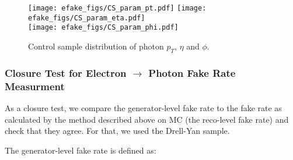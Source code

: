 
\begin{figure}[h]
\begin{center}
  {\label{CS_params_pt}\texttt{[image: efake\_figs/CS\_param\_pt.pdf]}}
  {\label{CS_params_eta}\texttt{[image: efake\_figs/CS\_param\_eta.pdf]}}
\\
  {\label{CS_params_phi}\texttt{[image: efake\_figs/CS\_param\_phi.pdf]}}
\caption{Control sample distribution of photon $p_T$, $\eta$ and $\phi$.}
\label{CS_params}
\end{center}
\end{figure}

\subsubsection{Closure Test for Electron $\rightarrow$ Photon Fake Rate Measurment}

As a closure test, we compare the generator-level fake rate to the fake rate as calculated by the method described above on MC (the reco-level fake rate) and check that they agree.
For that, we used the Drell-Yan sample.

The generator-level fake rate is defined as:

